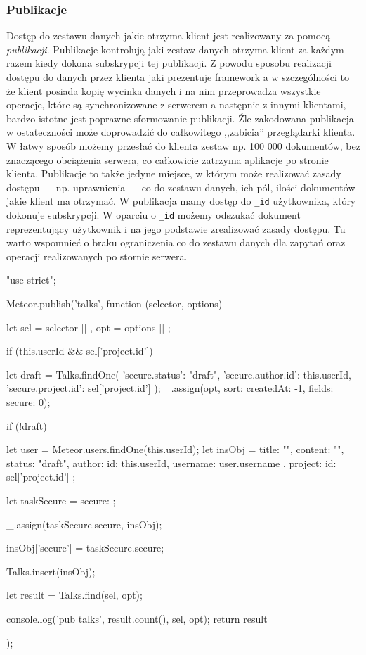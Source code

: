   \subsubsection{Publikacje}
Dostęp do zestawu danych jakie otrzyma klient jest realizowany za pomocą \emph{publikacji}. Publikacje kontrolują jaki zestaw danych otrzyma klient za każdym razem kiedy dokona subskrypcji tej publikacji. Z powodu sposobu realizacji dostępu do danych przez klienta jaki prezentuje framework a w szczególności to że klient posiada kopię wycinka danych i na nim przeprowadza wszystkie operacje, które są synchronizowane z serwerem a następnie z innymi klientami, bardzo istotne jest poprawne sformowanie publikacji. Źle zakodowana publikacja w ostateczności może doprowadzić do całkowitego ,,zabicia'' przeglądarki klienta. W łatwy sposób możemy przesłać do klienta zestaw np. 100 000 dokumentów, bez znaczącego obciążenia serwera, co całkowicie zatrzyma aplikacje po stronie klienta. Publikacje to także jedyne miejsce, w którym może realizować zasady dostępu --- np. uprawnienia --- co do zestawu danych, ich pól, ilości dokumentów jakie klient ma otrzymać. W publikacja mamy dostęp do \verb|_id| użytkownika, który dokonuje subskrypcji. W oparciu o \verb|_id| możemy odszukać dokument reprezentujący użytkownik i na jego podstawie zrealizować zasady dostępu. Tu warto wspomnieć o braku ograniczenia co do zestawu danych dla zapytań oraz operacji realizowanych po stornie serwera. 
\begin{js}[caption={{Publikacja \textit{,,talks''} dla kolekcji Talks}},label={lst:talks_pub}]
"use strict";

Meteor.publish('talks', function (selector, options) {
    let sel = selector || {},
        opt = options || {};

    if (this.userId && sel['project.id']) {
        let draft = Talks.findOne({
            'secure.status': "draft",
            'secure.author.id': this.userId,
            'secure.project.id': sel['project.id']
        });
        _.assign(opt, {sort: {createdAt: -1}, fields: {secure: 0}});
        
        if (!draft) {
            let user = Meteor.users.findOne(this.userId);
            let insObj = {
                title: "",
                content: "",
                status: "draft",
                author: {
                    id: this.userId,
                    username: user.username
                },
                project: {
                    id:  sel['project.id']
                }
            };

            let taskSecure = {secure: {}};

            _.assign(taskSecure.secure, insObj);

            insObj['secure'] = taskSecure.secure;

            Talks.insert(insObj);
        }

        let result = Talks.find(sel, opt);

        console.log('pub talks', result.count(), sel, opt);
        return result
    }
});
\end{js}
